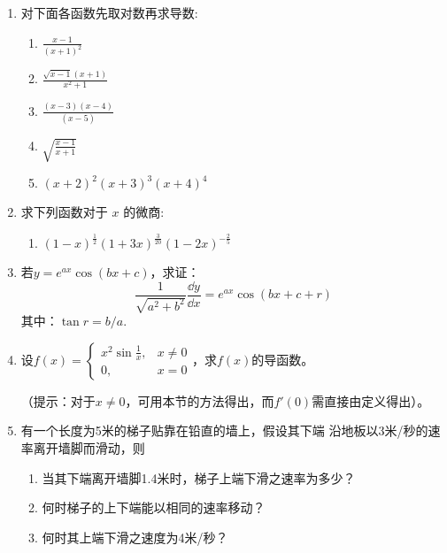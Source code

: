 \begin{ex}
\begin{enumerate}
 \item    对下面各函数先取对数再求导数:
 \begin{multicols}{2}
    \begin{enumerate}
        \item   $\frac{x-1}{(x+1)^{2}}$
        \item   $\frac{\sqrt{x-1}(x+1)}{x^{2}+1}$
        \item   $\frac{(x-3)(x-4)}{(x-5)}$
        \item   $\sqrt{\frac{x-1}{x+1}}$ 
        \item  $(x+2)^{2}(x+3)^{3}(x+4)^{4}$
\end{enumerate}
\end{multicols}
\item  求下列函数对于 $x$ 的微商:
\begin{enumerate}
\item $(1-x)^{\tfrac{1}{2}}(1+3x)^{\tfrac{3}{20}}(1-2x)^{-\tfrac{2}{5}}$
\end{enumerate}

\item 若$y=e^{ax}\cos(bx+c)$，求证：
\[\frac{1}{\sqrt{a^2+b^2}}\frac{\dd y}{\dd x}=e^{ax}\cos(bx+c+r)\]
其中：$\tan r=b/a$.

\item 设$f(x)=\begin{cases}
    x^2\sin\frac{1}{x},& x\ne 0\\
    0,& x=0
\end{cases}$，求$f(x)$的导函数。

（提示：对于$x\ne 0$，可用本节的方法得出，而$f'(0)$需直接由定义得出）。

\item 有一个长度为5米的梯子贴靠在铅直的墙上，假设其下端
沿地板以3米/秒的速率离开墙脚而滑动，则
\begin{enumerate}
    \item 当其下端离开墙脚1.4米时，梯子上端下滑之速率为多少？
    \item 何时梯子的上下端能以相同的速率移动？
    \item 何时其上端下滑之速度为4米/秒？
\end{enumerate}


\end{enumerate}
\end{ex}
